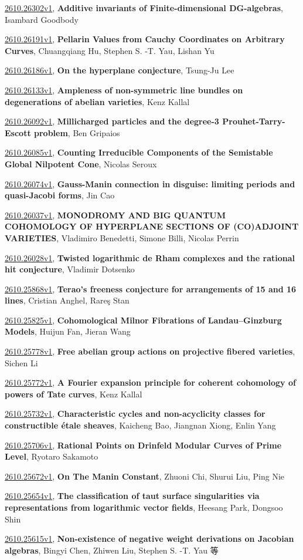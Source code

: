 \documentclass[9pt, a4paper]{article}
\theoremstyle{plain}
\theoremstyle{definition}
\theoremstyle{remark}
\newcommand{\arxiv}[3]{\href{https://arxiv.org/abs/#1}{#1}, \textbf{\textcolor{arxivblue}{#2}}, #3}
\begin{document}
\arxiv{2610.26302v1}{Additive invariants of Finite-dimensional DG-algebras}{Isambard Goodbody}

\arxiv{2610.26191v1}{Pellarin Values from Cauchy Coordinates on Arbitrary Curves}{Chuangqiang Hu, Stephen S. -T. Yau, Lishan Yu}

\arxiv{2610.26186v1}{On the hyperplane conjecture}{Tsung-Ju Lee}

\arxiv{2610.26133v1}{Ampleness of non-symmetric line bundles on degenerations of abelian varieties}{Kenz Kallal}

\arxiv{2610.26092v1}{Millicharged particles and the degree-3 Prouhet-Tarry-Escott problem}{Ben Gripaios}

\arxiv{2610.26085v1}{Counting Irreducible Components of the Semistable Global Nilpotent Cone}{Nicolas Seroux}

\arxiv{2610.26074v1}{Gauss-Manin connection in disguise: limiting periods and quasi-Jacobi forms}{Jin Cao}

\arxiv{2610.26037v1}{MONODROMY AND BIG QUANTUM COHOMOLOGY OF HYPERPLANE SECTIONS OF (CO)ADJOINT VARIETIES}{Vladimiro Benedetti, Simone Billi, Nicolas Perrin}

\arxiv{2610.26028v1}{Twisted logarithmic de Rham complexes and the rational hit conjecture}{Vladimir Dotsenko}

\arxiv{2610.25868v1}{Terao's freeness conjecture for arrangements of 15 and 16 lines}{Cristian Anghel, Rareş Stan}

\arxiv{2610.25825v1}{Cohomological Milnor Fibrations of Landau--Ginzburg Models}{Huijun Fan, Jieran Wang}

\arxiv{2610.25778v1}{Free abelian group actions on projective fibered varieties}{Sichen Li}

\arxiv{2610.25772v1}{A Fourier expansion principle for coherent cohomology of powers of Tate curves}{Kenz Kallal}

\arxiv{2610.25732v1}{Characteristic cycles and non-acyclicity classes for constructible étale sheaves}{Kaicheng Bao, Jiangnan Xiong, Enlin Yang}

\arxiv{2610.25706v1}{Rational Points on Drinfeld Modular Curves of Prime Level}{Ryotaro Sakamoto}

\arxiv{2610.25672v1}{On The Manin Constant}{Zhuoni Chi, Shurui Liu, Ping Nie}

\arxiv{2610.25654v1}{The classification of taut surface singularities via representations from logarithmic vector fields}{Heesang Park, Dongsoo Shin}

\arxiv{2610.25615v1}{Non-existence of negative weight derivations on Jacobian algebras}{Bingyi Chen, Zhiwen Liu, Stephen S. -T. Yau 等}
\end{document}
